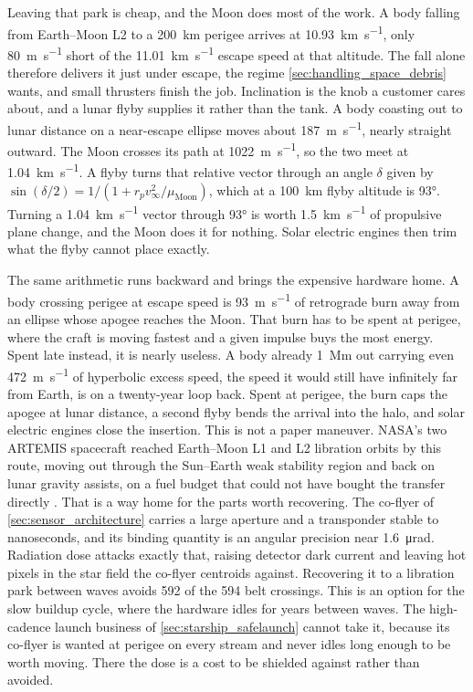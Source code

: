 \documentclass{article}
\begin{document}
Leaving that park is cheap, and the Moon does most of the work. A body falling from Earth--Moon L2 to a \SI{200}{\kilo\meter} perigee arrives at \SI{10.93}{\kilo\meter\per\second}, only \SI{80}{\meter\per\second} short of the \SI{11.01}{\kilo\meter\per\second} escape speed at that altitude. The fall alone therefore delivers it just under escape, the regime \autoref{sec:handling_space_debris} wants, and small thrusters finish the job. Inclination is the knob a customer cares about, and a lunar flyby supplies it rather than the tank. A body coasting out to lunar distance on a near-escape ellipse moves about \SI{187}{\meter\per\second}, nearly straight outward. The Moon crosses its path at \SI{1022}{\meter\per\second}, so the two meet at \SI{1.04}{\kilo\meter\per\second}. A flyby turns that relative vector through an angle $\delta$ given by $\sin(\delta/2) = 1/(1 + r_p v_\infty^2 / \mu_{\mathrm{Moon}})$, which at a \SI{100}{\kilo\meter} flyby altitude is \ang{93}. Turning a \SI{1.04}{\kilo\meter\per\second} vector through \ang{93} is worth \SI{1.5}{\kilo\meter\per\second} of propulsive plane change, and the Moon does it for nothing. Solar electric engines then trim what the flyby cannot place exactly.

The same arithmetic runs backward and brings the expensive hardware home. A body crossing perigee at escape speed is \SI{93}{\meter\per\second} of retrograde burn away from an ellipse whose apogee reaches the Moon. That burn has to be spent at perigee, where the craft is moving fastest and a given impulse buys the most energy. Spent late instead, it is nearly useless. A body already \SI{1}{\mega\meter} out carrying even \SI{472}{\meter\per\second} of hyperbolic excess speed, the speed it would still have infinitely far from Earth, is on a twenty-year loop back. Spent at perigee, the burn caps the apogee at lunar distance, a second flyby bends the arrival into the halo, and solar electric engines close the insertion. This is not a paper maneuver. NASA's two ARTEMIS spacecraft reached Earth--Moon L1 and L2 libration orbits by this route, moving out through the Sun--Earth weak stability region and back on lunar gravity assists, on a fuel budget that could not have bought the transfer directly \cite{folta2012artemis}. That is a way home for the parts worth recovering. The co-flyer of \autoref{sec:sensor_architecture} carries a large aperture and a transponder stable to nanoseconds, and its binding quantity is an angular precision near \SI{1.6}{\micro\radian}. Radiation dose attacks exactly that, raising detector dark current and leaving hot pixels in the star field the co-flyer centroids against. Recovering it to a libration park between waves avoids 592 of the 594 belt crossings. This is an option for the slow buildup cycle, where the hardware idles for years between waves. The high-cadence launch business of \autoref{sec:starship_safelaunch} cannot take it, because its co-flyer is wanted at perigee on every stream and never idles long enough to be worth moving. There the dose is a cost to be shielded against rather than avoided.
\end{document}
